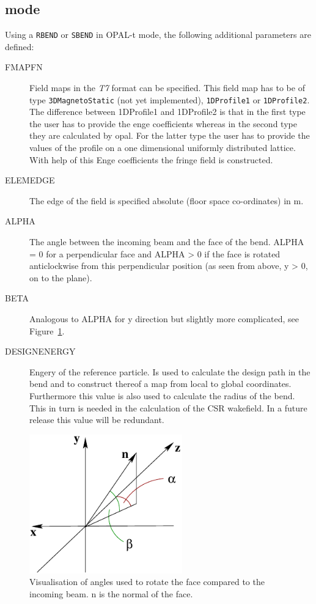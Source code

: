 \subsection{\opalt mode}
\label{sec:quadrupole-t}
Using a \texttt{RBEND} or \texttt{SBEND} in OPAL-t mode, the following additional parameters are defined:
\begin{description}
\item[FMAPFN]
  Field maps in the {\em T7} format can be specified. This field map has to be of type \texttt{3DMagnetoStatic} (not yet implemented), \texttt{1DProfile1} or \texttt{1DProfile2}. The difference between 1DProfile1 and 1DProfile2 is that in the first type the user has to provide the enge coefficients whereas in the second type they are calculated by opal. For the latter type the user has to provide the values of the profile on a one dimensional uniformly distributed lattice. With help of this Enge coefficients the fringe field is constructed.
\item[ELEMEDGE]
  The edge of the field is specified absolute (floor space co-ordinates) in m.
\item[ALPHA]
  The angle between the incoming beam and the face of the bend. ALPHA = 0 for a perpendicular face and ALPHA > 0 if the face is rotated anticlockwise from this perpendicular position (as seen from above, y > 0, on to the plane).
\item[BETA]
  Analogous to ALPHA for y direction but slightly more complicated, see Figure~\ref{rbendangle}.
\item[DESIGNENERGY]
  Engery of the reference particle. Is used to calculate the design path in the bend and to construct thereof a map from local to global coordinates. Furthermore this value is also used to calculate the radius of the bend. This in turn is needed in the calculation of the CSR wakefield. In a future release this value will be redundant.
\end{description}
\begin{figure}
  \begin{center}
  \includegraphics[origin=bl,height=60mm,angle=0]{./figures/rbendangle.pdf}
  \caption{\label{rbendangle}
    Visualisation of angles used to rotate the face compared to the incoming beam. n is the normal of the face.
  }
  \end{center}
%
\end{figure}

